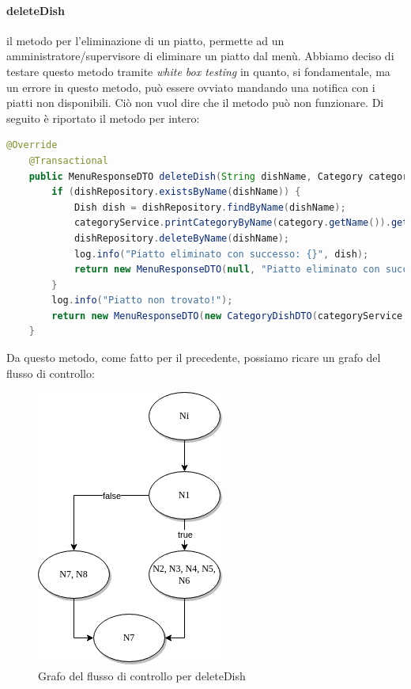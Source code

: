 \paragraph{deleteDish} il metodo per l'eliminazione di un piatto, permette ad un amministratore/supervisore di eliminare un piatto dal menù. Abbiamo deciso di testare questo metodo tramite \textit{white box testing} in quanto, si fondamentale, ma un errore in questo metodo, può essere ovviato mandando una notifica con i piatti non disponibili. Ciò non vuol dire che il metodo può non funzionare. Di seguito è riportato il metodo per intero:
\begin{lstlisting}[language=java]
    @Override
    @Transactional
    public MenuResponseDTO deleteDish(String dishName, Category category) {
        if (dishRepository.existsByName(dishName)) {
            Dish dish = dishRepository.findByName(dishName);
            categoryService.printCategoryByName(category.getName()).getCategoryDishDTO().getCategory().getDishes().remove(dish);
            dishRepository.deleteByName(dishName);
            log.info("Piatto eliminato con successo: {}", dish);
            return new MenuResponseDTO(null, "Piatto eliminato con successo", true);
        }
        log.info("Piatto non trovato!");
        return new MenuResponseDTO(new CategoryDishDTO(categoryService.printCategoryByName(category.getName()).getCategoryDishDTO().getDishes(), category), "Piatto inesistente", false);
    }
\end{lstlisting}
Da questo metodo, come fatto per il precedente, possiamo ricare un grafo del flusso di controllo:
\begin{figure}[H]
    \centering
    \includegraphics[scale=0.8]{img/whiteBox/deleteDish.png}
    \caption{Grafo del flusso di controllo per deleteDish}
\end{figure}
